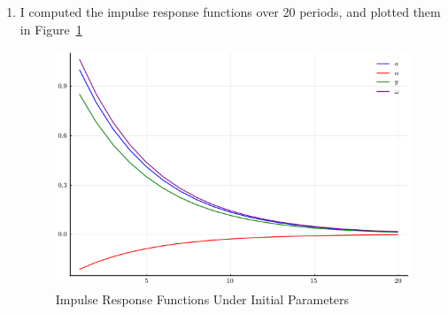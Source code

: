 \documentclass[10pt]{article}
\begin{document}
\begin{enumerate}
	\item I computed the impulse response functions over 20 periods, and plotted them in Figure~\ref{fig:q2irf} \begin{figure}[H] \centering \includegraphics[width=12cm]{q2_irf.png} \caption{Impulse Response Functions Under Initial Parameters} \label{fig:q2irf}\end{figure}

\end{enumerate}
\end{document}
